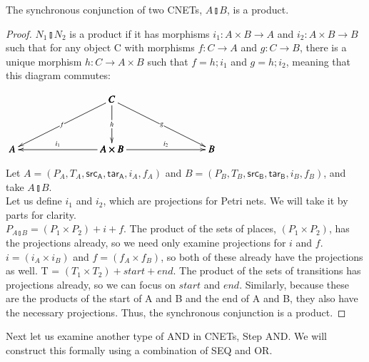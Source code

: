 \begin{lemma}
\label{lemma:SYNC-AND-PRODUCT}
The synchronous conjunction of two CNETs, $A \talloblong B$, is a product.
\end{lemma}
\begin{proof}
$N_1 \talloblong N_2$ is a product if it has morphisms $i_1: A \times B \to A$ and $i_2: A \times B \to B$ such that for any object C with morphisms $f: C\to A$ and $g: C\to B$, there is a unique morphism $h: C \to A \times B$ such that $f =h; i_1$ and $g = h;i_2$, meaning that this diagram commutes:\\
\begin{center}
  \begin{math}
    \bfig
    \Atrianglepair|mmmaa|/->`->`->`<-`->/<1000,500>[
      C`
      A`
      A\times B`
      B;
      f`
      h`
      g`
      i_1`
      i_2]
    \efig
  \end{math}
\end{center}
Let $A = (P_A, T_A, \mathsf{src_A}, \mathsf{tar_A}, i_A, f_A)$ and $B = (P_B, T_B, \mathsf{src_B}, \mathsf{tar_B}, i_B, f_B)$, and take $A \talloblong B$.\\
Let us define $i_1$ and $i_2$, which are projections for Petri nets. We will take it by parts for clarity.\\
$P_{A \talloblong B} = (P_1 \times P_2) + i + f$. The product of the sets of places, $(P_1 \times P_2)$, has the projections already, so we need only examine projections for $i$ and $f$. $i =  (i_A \times i_B)$ and $f =  (f_A \times f_B)$, so both of these already have the projections as well.
T = $(T_1 \times T_2) + start + end$. The product of the sets of transitions has projections already, so we can focus on $start$ and $end$. Similarly, because these are the products of the start of A and B and the end of A and B, they also have the necessary projections. Thus, the synchronous conjunction is a product.
\end{proof} 
\begin{example}
  \label{ex:STEP-AND-PN}
Next let us examine another type of AND in CNETs, Step AND. We will construct this formally using a combination of SEQ and OR.
\end{example}
